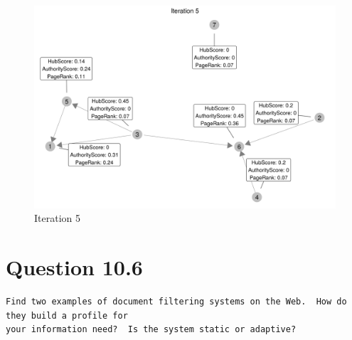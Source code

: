 \documentclass[11pt]{article}
\newenvironment{code}{\captionsetup{type=listing}}{}
\begin{document}
\begin{figure}[H]
\centering
\includegraphics[scale=.8]{q1_iteration5.png}
\caption{Iteration 5}
\label{fig:q1_i5}
\end{figure}
\begin{code}
\label{code:q1p}
\end{code}
\begin{code}
\label{code:q1r}
\end{code}
\newpage
\section{Question 10.6} \label{q2}
\begin{verbatim}
Find two examples of document filtering systems on the Web.  How do they build a profile for 
your information need?  Is the system static or adaptive?
\end{verbatim}
\end{document}
